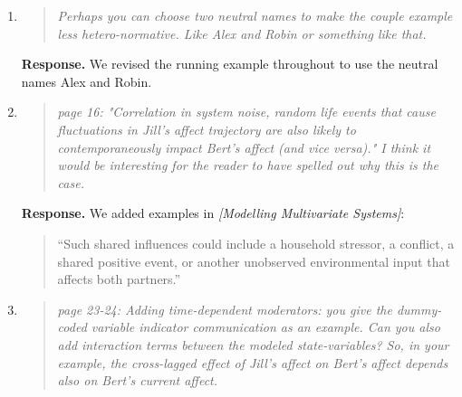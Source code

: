 \documentclass[11pt]{article}
\newcommand{\response}{\textbf{Response.} }
\newcommand{\secit}[1]{\textit{[#1]}}
\newcommand{\msq}[1]{\begin{quote}\small\noindent``#1''\end{quote}}
\newenvironment{reviewerpoint}{\begin{quote}\itshape}{\end{quote}}
\begin{document}
\begin{enumerate}[label=\textbf{Reviewer 1, Minor Point \arabic*.}]
\begin{reviewerpoint}
Page 14: Jill continues "Consider Jill, who attends weekly therapy sessions during her 20-week treatment period.
Each session provides a temporary boost to her affect.
The longer term effect of the therapy is already accounted for by the growth trajectory we have already specified in earlier examples." This is where the running example for me finally departs from reality.
I don't think that this is a fair representation of how any therapy works.
Not sure how to deal with this.
Perhaps just acknowledge it?
I don't know.
\end{reviewerpoint}

\response In \secit{Impulse Effects} we expanded slightly on this to at least make clear the perhaps implausible assumptions.
\item

\begin{reviewerpoint}
Perhaps you can choose two neutral names to make the couple example less hetero-normative.
Like Alex and Robin or something like that.
\end{reviewerpoint}

\response We revised the running example throughout to use the neutral names Alex and Robin.
\item

\begin{reviewerpoint}
page 16: "Correlation in system noise, random life events that cause fluctuations in Jill's affect trajectory are also likely to contemporaneously impact Bert's affect (and vice versa)." I think it would be interesting for the reader to have spelled out why this is the case.
\end{reviewerpoint}

\response We added examples in \secit{Modelling Multivariate Systems}:
\msq{Such shared influences could include a household stressor, a conflict, a shared positive event, or another unobserved environmental input that affects both partners.}
\item

\begin{reviewerpoint}
page 23-24: Adding time-dependent moderators: you give the dummy-coded variable indicator communication as an example.
Can you also add interaction terms between the modeled state-variables?
So, in your example, the cross-lagged effect of Jill's affect on Bert's affect depends also on Bert's current affect.
\end{reviewerpoint}


\end{enumerate}
\end{document}
